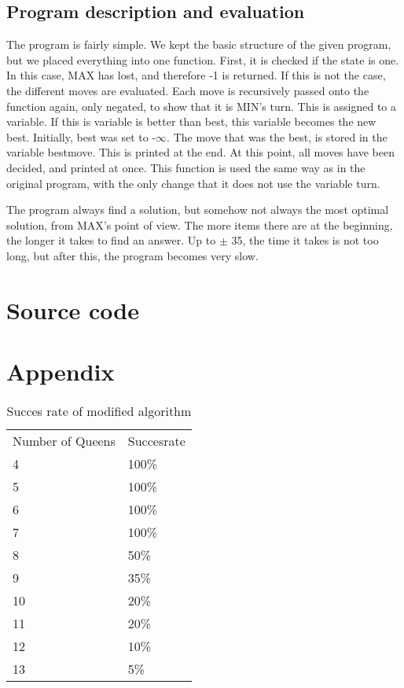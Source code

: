 \documentclass{article}
\begin{document}
	\subsection*{Program description and evaluation}
	
	The program is fairly simple. We kept the basic structure of the given program, but we placed everything into one function. First, it is checked if the state is one. In this case, MAX has lost, and therefore -1 is returned. If this is not the case, the different moves are evaluated. Each move is recursively passed onto the function again, only negated, to show that it is MIN's turn. This is assigned to a variable. If this is variable is better than best, this variable becomes the new best. Initially, best was set to -$\infty$. The move that was the best, is stored in the variable bestmove. This is printed at the end. At this point, all moves have been decided, and printed at once. This function is used the same way as in the original program, with the only change that it does not use the variable turn.
	
	The program always find a solution, but somehow not always the most optimal solution, from MAX's point of view. The more items there are at the beginning, the longer it takes to find an answer. Up to $\pm$ 35, the time it takes is not too long, but after this, the program becomes very slow. 
	
	
	\section*{Source code}
	
	
	
	
	\section*{Appendix}
\begin{table}[H]
\centering
\caption{Succes rate of modified algorithm}
\label{my-label}
\begin{tabular}{ll}
Number of Queens & Succesrate \\
4                & 100\%      \\
5                & 100\%      \\
6                & 100\%      \\
7                & 100\%      \\
8                & 50\%       \\
9                & 35\%       \\
10               & 20\%       \\
11               & 20\%       \\
12               & 10\%       \\
13               & 5\%       
\end{tabular}
\end{table}
		
\end{document}
